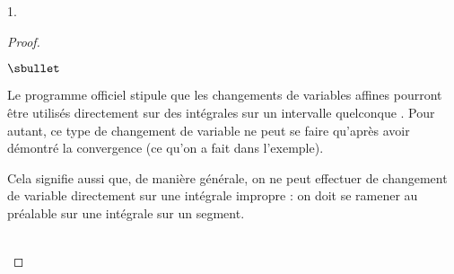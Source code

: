 \begin{noliste}{1.}
\begin{proof}
\newpage


\begin{remark}%
  \begin{noliste}{$\sbullet$}
  \item Le programme officiel stipule que \og les changements de
    variables affines pourront être utilisés directement sur des
    intégrales sur un intervalle quelconque \fg{}. Pour autant, ce
    type de changement de variable ne peut se faire qu'après avoir
    démontré la convergence (ce qu'on a fait dans l'exemple). 
  \item Cela signifie aussi que, de manière générale, on ne peut
    effectuer de changement de variable directement sur une intégrale
    impropre : on doit se ramener au préalable sur une intégrale sur
    un segment.
  \end{noliste}
\end{remark}~\\[-1.3cm]
\end{proof}

\end{noliste}

